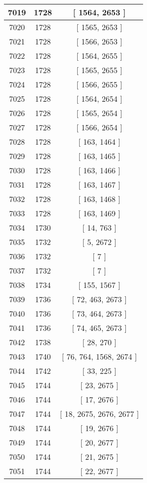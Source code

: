 \begin{center}
\begin{longtable}[H]{|| c c c ||}
\hline
7019 & 1728 & [ 1564, 2653 ] \\ 
\hline
7020 & 1728 & [ 1565, 2653 ] \\ 
\hline
7021 & 1728 & [ 1566, 2653 ] \\ 
\hline
7022 & 1728 & [ 1564, 2655 ] \\ 
\hline
7023 & 1728 & [ 1565, 2655 ] \\ 
\hline
7024 & 1728 & [ 1566, 2655 ] \\ 
\hline
7025 & 1728 & [ 1564, 2654 ] \\ 
\hline
7026 & 1728 & [ 1565, 2654 ] \\ 
\hline
7027 & 1728 & [ 1566, 2654 ] \\ 
\hline
7028 & 1728 & [ 163, 1464 ] \\ 
\hline
7029 & 1728 & [ 163, 1465 ] \\ 
\hline
7030 & 1728 & [ 163, 1466 ] \\ 
\hline
7031 & 1728 & [ 163, 1467 ] \\ 
\hline
7032 & 1728 & [ 163, 1468 ] \\ 
\hline
7033 & 1728 & [ 163, 1469 ] \\ 
\hline
7034 & 1730 & [ 14, 763 ] \\ 
\hline
7035 & 1732 & [ 5, 2672 ] \\ 
\hline
7036 & 1732 & [ 7 ] \\ 
\hline
7037 & 1732 & [ 7 ] \\ 
\hline
7038 & 1734 & [ 155, 1567 ] \\ 
\hline
7039 & 1736 & [ 72, 463, 2673 ] \\ 
\hline
7040 & 1736 & [ 73, 464, 2673 ] \\ 
\hline
7041 & 1736 & [ 74, 465, 2673 ] \\ 
\hline
7042 & 1738 & [ 28, 270 ] \\ 
\hline
7043 & 1740 & [ 76, 764, 1568, 2674 ] \\ 
\hline
7044 & 1742 & [ 33, 225 ] \\ 
\hline
7045 & 1744 & [ 23, 2675 ] \\ 
\hline
7046 & 1744 & [ 17, 2676 ] \\ 
\hline
7047 & 1744 & [ 18, 2675, 2676, 2677 ] \\ 
\hline
7048 & 1744 & [ 19, 2676 ] \\ 
\hline
7049 & 1744 & [ 20, 2677 ] \\ 
\hline
7050 & 1744 & [ 21, 2675 ] \\ 
\hline
7051 & 1744 & [ 22, 2677 ] \\ 

\end{longtable}
\end{center}
